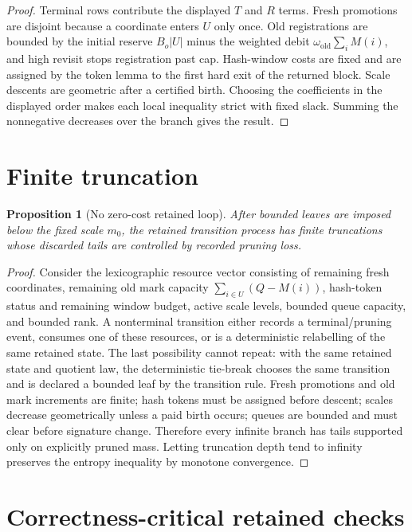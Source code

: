 \documentclass[11pt]{article}
\newtheorem{proposition}[theorem]{Proposition}
\theoremstyle{remark}
\newcommand{\old}{\mathrm{old}}
\begin{document}
\begin{proof}
Terminal rows contribute the displayed $T$ and $R$ terms.  Fresh promotions are disjoint because a coordinate enters $U$ only once.  Old registrations are bounded by the initial reserve $B_o|U|$ minus the weighted debit $\omega_{\old}\sum_i M(i)$, and high revisit stops registration past cap.  Hash-window costs are fixed and are assigned by the token lemma to the first hard exit of the returned block.  Scale descents are geometric after a certified birth.  Choosing the coefficients in the displayed order makes each local inequality strict with fixed slack.  Summing the nonnegative decreases over the branch gives the result.
\end{proof}

\section{Finite truncation}\label{app:finite}

\begin{proposition}[No zero-cost retained loop]\label{prop:app-no-loop}
After bounded leaves are imposed below the fixed scale $m_0$, the retained transition process has finite truncations whose discarded tails are controlled by recorded pruning loss.
\end{proposition}

\begin{proof}
Consider the lexicographic resource vector consisting of remaining fresh coordinates, remaining old mark capacity $\sum_{i\in U}(Q-M(i))$, hash-token status and remaining window budget, active scale levels, bounded queue capacity, and bounded rank.  A nonterminal transition either records a terminal/pruning event, consumes one of these resources, or is a deterministic relabelling of the same retained state.  The last possibility cannot repeat: with the same retained state and quotient law, the deterministic tie-break chooses the same transition and is declared a bounded leaf by the transition rule.  Fresh promotions and old mark increments are finite; hash tokens must be assigned before descent; scales decrease geometrically unless a paid birth occurs; queues are bounded and must clear before signature change.  Therefore every infinite branch has tails supported only on explicitly pruned mass.  Letting truncation depth tend to infinity preserves the entropy inequality by monotone convergence.
\end{proof}

\section{Correctness-critical retained checks}\label{app:critical}
\end{document}
